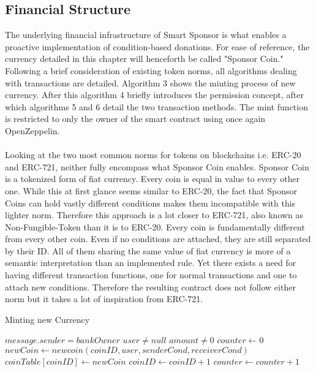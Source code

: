 \subsection{Financial Structure}
The underlying financial infrastructure of Smart Sponsor is what enables a proactive implementation of condition-based donations. For ease of reference, the currency detailed in this chapter will henceforth be called "Sponsor Coin." Following a brief consideration of existing token norms, all algorithms dealing with transactions are detailed. Algorithm 3 shows the minting process of new currency. After this algorithm 4 briefly introduces the permission concept, after which algorithms 5 and 6 detail the two transaction methods. The mint function is restricted to only the owner of the smart contract using once again OpenZeppelin\cite{Zeppelin}.\\
\\
Looking at the two most common norms for tokens on blockchains i.e. ERC-20 and ERC-721, neither fully encompass what Sponsor Coin enables. Sponsor Coin is a tokenized form of fiat currency. Every coin is equal in value to every other one. While this at first glance seems similar to ERC-20, the fact that Sponsor Coins can hold vastly different conditions makes them incompatible with this lighter norm. Therefore this approach is a lot closer to ERC-721, also known as Non-Fungible-Token than it is to ERC-20. Every coin is fundamentally different from every other coin. Even if no conditions are attached, they are still separated by their ID. All of them sharing the same value of fiat currency is more of a semantic interpretation than an implemented rule. Yet there exists a need for having different transaction functions, one for normal transactions and one to attach new conditions. Therefore the resulting contract does not follow either norm but it takes a lot of inspiration from ERC-721.\\
\begin{algorithm}
\caption{Minting new Currency}\label{alg:mint}
\begin{algorithmic}
\Require $message.sender = bankOwner$
\Require $user \neq null$
\Require $amount \neq 0$
\State $counter \gets 0$
\State $newCoin \gets new coin(coinID, user, senderCond, receiverCond)$
\State $coinTable[coinID] \gets newCoin$
\State $coinID \gets coinID + 1$
\State $counter \gets counter + 1$
\EndWhile
\end{algorithmic}
\end{algorithm}
\\
